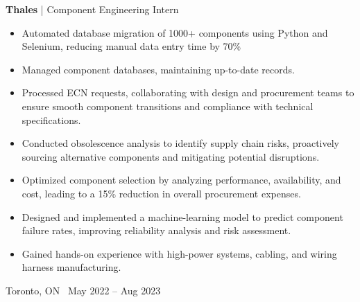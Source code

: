 \documentclass[10pt, letterpaper]{article}
\newenvironment{highlights}{
    \begin{itemize}[
        topsep=0.10 cm,
        parsep=0.10 cm,
        partopsep=0pt,
        itemsep=0pt,
        leftmargin=0.4 cm + 10pt
    ]
}{
    \end{itemize}
} %
\newenvironment{twocolentry}[2][]{
    \onecolentry
    \def\secondColumn{#2}
    \setcolumnwidth{\fill, 4.5 cm}
    \begin{paracol}{2}
}{
    \switchcolumn \raggedleft \secondColumn
    \end{paracol}
    \endonecolentry
} %
\begin{document}
        \begin{twocolentry}{Toronto, ON \ May 2022 – Aug 2023}
        \textbf{Thales} | Component Engineering Intern
        \begin{highlights}
        \item Automated database migration of 1000+ components using Python and Selenium, reducing manual data entry time by 70\%
        \item Managed component databases, maintaining up-to-date records.
        \item Processed ECN requests, collaborating with design and procurement teams to ensure smooth component transitions and compliance with technical specifications.
        \item Conducted obsolescence analysis to identify supply chain risks, proactively sourcing alternative components and mitigating potential disruptions.
        \item Optimized component selection by analyzing performance, availability, and cost, leading to a 15\% reduction in overall procurement expenses.
        \item Designed and implemented a machine-learning model to predict component failure rates, improving reliability analysis and risk assessment.
        \item Gained hands-on experience with high-power systems, cabling, and wiring harness manufacturing.
        \end{highlights}
        \end{twocolentry}
        
        \vspace{0.5 cm} %
        
\end{document}
